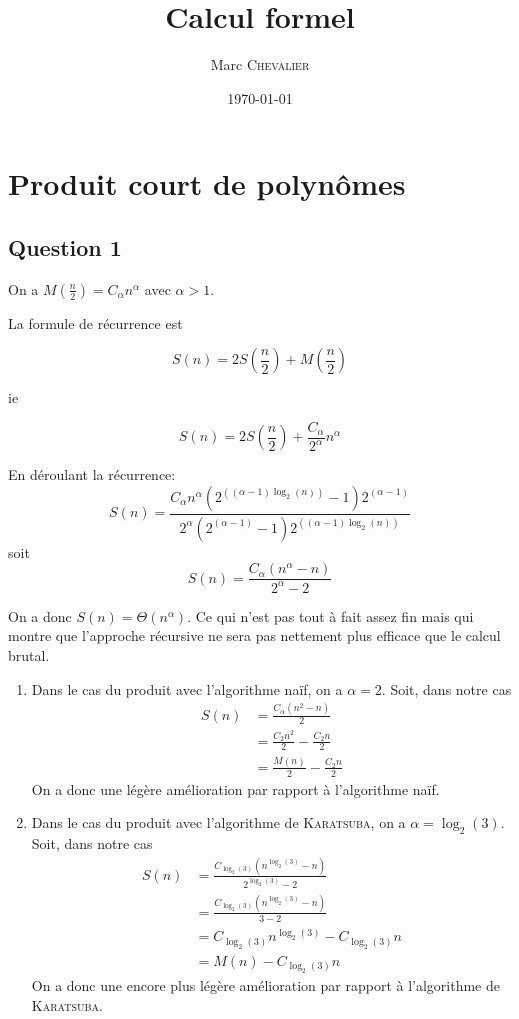 

\title{Calcul formel}
\author{
    Marc \textsc{Chevalier}
}
\date{\today}


\maketitle

\section*{Produit court de polynômes}

\subsection*{Question 1}

On a $M\left(\frac{n}{2}\right) = C_\alpha n^\alpha$ avec $\alpha>1$.

La formule de récurrence est 

\[
    S(n) = 2S\left(\frac{n}{2}\right) + M\left(\frac{n}{2}\right)
\]

ie 

\[
    S(n) = 2S\left(\frac{n}{2}\right) + \frac{C_\alpha}{2^\alpha}n^\alpha
\]

En déroulant la récurrence:
\[
    S(n)=\frac{C_\alpha n^\alpha(2^{((\alpha-1)\log_2(n))}-1)2^{(\alpha-1)}}{2^\alpha(2^{(\alpha-1)}-1)2^{((\alpha-1)\log_2(n))}}
\]
soit
\[
    S(n) = \frac{C_\alpha(n^\alpha-n)}{2^\alpha-2}
\]

On a donc $S(n) = \Theta(n^\alpha)$. Ce qui n'est pas tout à fait assez fin mais qui montre que l'approche récursive ne sera pas nettement plus efficace que le calcul brutal.

\begin{enumerate}
    \item Dans le cas du produit avec l'algorithme naïf, on a $\alpha = 2$. Soit, dans notre cas
\[
    \begin{aligned}
        S(n) &= \frac{C_\alpha(n^2-n)}{2}\\
        &= \frac{C_2 n^2}{2} - \frac{C_2 n}{2}\\
        &= \frac{M(n)}{2} - \frac{C_2 n}{2}
    \end{aligned}
\]
    On a donc une légère amélioration par rapport à l'algorithme naïf.
    
    \item Dans le cas du produit avec l'algorithme de \textsc{Karatsuba}, on a $\alpha = \log_2(3)$. Soit, dans notre cas
\[
    \begin{aligned}
        S(n) &= \frac{C_{\log_2(3)}(n^{\log_2(3)}-n)}{2^{\log_2(3)}-2}\\
        &= \frac{C_{\log_2(3)}(n^{\log_2(3)}-n)}{3-2}\\
        &= C_{\log_2(3)}n^{\log_2(3)}-C_{\log_2(3)}n\\
        &= M(n) -C_{\log_2(3)} n
    \end{aligned}
\]
    On a donc une encore plus légère amélioration par rapport à l'algorithme de \textsc{Karatsuba}.
\end{enumerate}

